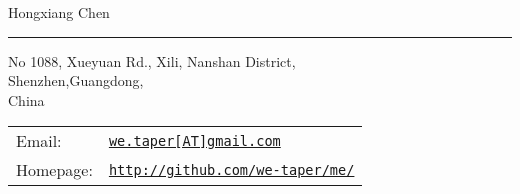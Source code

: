\documentclass[letterpaper]{article}
\def\name{Hongxiang Chen}
\begin{document}
{\huge \name}
\vspace{+8pt}
\hrule height .7pt
\smallskip

\vspace{0.15in}

\begin{minipage}{0.44\linewidth}
  No 1088, Xueyuan Rd., Xili, Nanshan District,\\
  Shenzhen,Guangdong,\\
  China \\
\end{minipage}
\begin{minipage}{0.55\linewidth}
\begin{tabular}{ll}
Email: 
    & \href{mailto:we.taper[at]gmail.com}{\tt we.taper[AT]gmail.com} \\
Homepage: 
    & \href{http://github.com/we-taper/me/}{\tt http://github.com/we-taper/me/} \\
\end{tabular}
\end{minipage}
\end{document}
